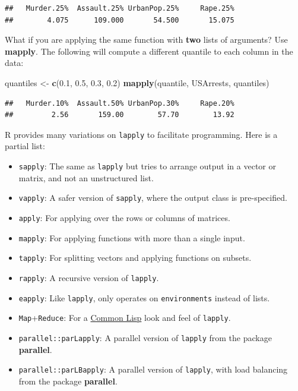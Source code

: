 \documentclass[]{book}
\newenvironment{Shaded}{\begin{snugshade}}{\end{snugshade}}
\newcommand{\KeywordTok}[1]{\textcolor[rgb]{0.13,0.29,0.53}{\textbf{#1}}}
\newcommand{\FloatTok}[1]{\textcolor[rgb]{0.00,0.00,0.81}{#1}}
\newcommand{\StringTok}[1]{\textcolor[rgb]{0.31,0.60,0.02}{#1}}
\newcommand{\NormalTok}[1]{#1}
\providecommand{\tightlist}{%
  \setlength{\itemsep}{0pt}\setlength{\parskip}{0pt}}
\theoremstyle{definition}
\theoremstyle{definition}
\theoremstyle{definition}
\theoremstyle{remark}
\begin{document}
\begin{verbatim}
##   Murder.25%  Assault.25% UrbanPop.25%     Rape.25% 
##        4.075      109.000       54.500       15.075
\end{verbatim}

What if you are applying the same function with \textbf{two} lists of
arguments? Use \textbf{mapply}. The following will compute a different
quantile to each column in the data:

\begin{Shaded}
\begin{Highlighting}[]
\NormalTok{quantiles <-}\StringTok{ }\KeywordTok{c}\NormalTok{(}\FloatTok{0.1}\NormalTok{, }\FloatTok{0.5}\NormalTok{, }\FloatTok{0.3}\NormalTok{, }\FloatTok{0.2}\NormalTok{)}
\KeywordTok{mapply}\NormalTok{(quantile, USArrests, quantiles)}
\end{Highlighting}
\end{Shaded}

\begin{verbatim}
##   Murder.10%  Assault.50% UrbanPop.30%     Rape.20% 
##         2.56       159.00        57.70        13.92
\end{verbatim}

R provides many variations on \texttt{lapply} to facilitate programming.
Here is a partial list:

\begin{itemize}
\tightlist
\item
  \texttt{sapply}: The same as \texttt{lapply} but tries to arrange
  output in a vector or matrix, and not an unstructured list.
\item
  \texttt{vapply}: A safer version of \texttt{sapply}, where the output
  class is pre-specified.
\item
  \texttt{apply}: For applying over the rows or columns of matrices.
\item
  \texttt{mapply}: For applying functions with more than a single input.
\item
  \texttt{tapply}: For splitting vectors and applying functions on
  subsets.
\item
  \texttt{rapply}: A recursive version of \texttt{lapply}.
\item
  \texttt{eapply}: Like \texttt{lapply}, only operates on
  \texttt{environments} instead of lists.
\item
  \texttt{Map}+\texttt{Reduce}: For a
  \href{https://en.wikipedia.org/wiki/Common_Lisp}{Common Lisp} look and
  feel of \texttt{lapply}.
\item
  \texttt{parallel::parLapply}: A parallel version of \texttt{lapply}
  from the package \textbf{parallel}.
\item
  \texttt{parallel::parLBapply}: A parallel version of \texttt{lapply},
  with load balancing from the package \textbf{parallel}.
\end{itemize}
\end{document}
